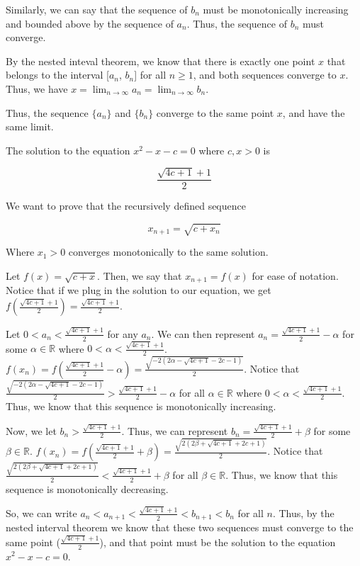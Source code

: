 \documentclass[addpoints]{exam}
\begin{document}
\begin{questions}
Similarly, we can say that the sequence of $b_n$ must be monotonically increasing and bounded above by the sequence of $a_n$. 
Thus, the sequence of $b_n$ must converge.

By the nested inteval theorem, we know that there is exactly one point $x$ that belongs to the interval [$a_n$, $b_n$] for all $n \geq 1$,
and both sequences converge to $x$. Thus, we have $x = \lim_{n \to \infty} a_n = \lim_{n \to \infty} b_n$. 

Thus, the sequence $\{a_n\}$ and $\{b_n\}$ converge to the same point $x$, and have the same limit. 

\question The solution to the equation $x^2 - x - c = 0$ where $c, x > 0$ is 

\[\frac{\sqrt{4c + 1} + 1}{2}\]

We want to prove that the recursively defined sequence

\[x_{n+1} = \sqrt{c + x_n}\] 

Where $x_1 > 0$ converges monotonically to the same solution. 

Let $f(x) = \sqrt{c + x}$. Then, we say that $x_{n+1} = f(x)$ for ease of notation.
Notice that if we plug in the solution to our equation, we get $f(\frac{\sqrt{4c + 1} + 1}{2}) = \frac{\sqrt{4c + 1} + 1}{2}$. 

Let $0 < a_n < \frac{\sqrt{4c + 1} + 1}{2}$ for any $a_n$. We can then represent $a_n = \frac{\sqrt{4c + 1} + 1}{2} - \alpha$ for some
$\alpha \in \mathbb{R}$ where $0 < \alpha < \frac{\sqrt{4c + 1} + 1}{2}$. $f(x_n) = f(\frac{\sqrt{4c + 1} + 1}{2} - \alpha) = 
\frac{\sqrt{-2(2\alpha - \sqrt{4c + 1} -2c - 1)}}{2}$. Notice that $\frac{\sqrt{-2(2\alpha - \sqrt{4c + 1} -2c - 1)}}{2} > 
\frac{\sqrt{4c + 1} + 1}{2} - \alpha$ for all $\alpha \in \mathbb{R}$ where $0 < \alpha < \frac{\sqrt{4c + 1} + 1}{2}$. Thus, we know that
this sequence is monotonically increasing. 

Now, we let $b_n > \frac{\sqrt{4c + 1} + 1}{2}$. Thus, we can represent $b_n = \frac{\sqrt{4c + 1} + 1}{2} + \beta$ for some 
$\beta \in \mathbb{R}$. $f(x_n) = f(\frac{\sqrt{4c + 1} + 1}{2} + \beta) = \frac{\sqrt{2(2\beta + \sqrt{4c + 1} + 2c + 1)}}{2}$.
Notice that $\frac{\sqrt{2(2\beta + \sqrt{4c + 1} + 2c + 1)}}{2} < \frac{\sqrt{4c + 1} + 1}{2} + \beta$ for all $\beta \in \mathbb{R}$. 
Thus, we know that this sequence is monotonically decreasing. 

So, we can write $a_n < a_{n+1} < \frac{\sqrt{4c + 1} + 1}{2} < b_{n+1} < b_n$ for all $n$. Thus, by the nested interval theorem 
we know that these two sequences must converge to the same point ($\frac{\sqrt{4c + 1} + 1}{2}$), and that point must be the 
solution to the equation $x^2 - x - c = 0$. 


\end{questions}
\end{document}

